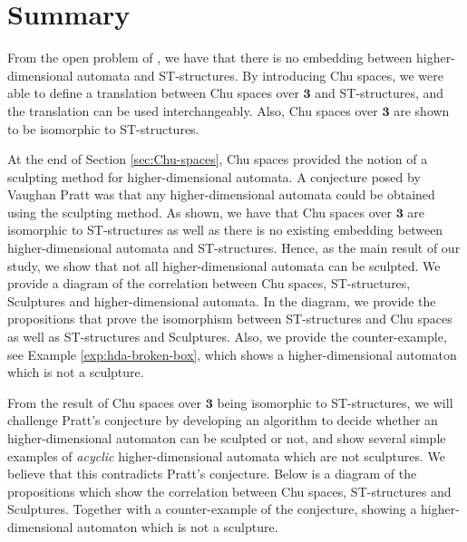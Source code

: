 \section{Summary}
\label{sec:summary-4-relationship}

    From the open problem of \cite{Johansen16STstruct}, we have that there is no embedding between higher-dimensional automata and ST-structures. By introducing Chu spaces, we were able to define a translation between Chu spaces over $\mathbf{3}$ and ST-structures, and the translation can be used interchangeably. Also, Chu spaces over $\mathbf{3}$ are shown to be isomorphic to ST-structures.
    
    At the end of Section \ref{sec:Chu-spaces}, Chu spaces provided the notion of a sculpting method for higher-dimensional automata. A conjecture posed by Vaughan Pratt was that any higher-dimensional automata could be obtained using the sculpting method. As shown, we have that Chu spaces over $\mathbf{3}$ are isomorphic to ST-structures as well as there is no existing embedding between higher-dimensional automata and ST-structures. Hence, as the main result of our study, we show that not all higher-dimensional automata can be sculpted. We provide a diagram of the correlation between Chu spaces, ST-structures, Sculptures and higher-dimensional automata. In the diagram, we provide the propositions that prove the isomorphism between ST-structures and Chu spaces as well as ST-structures and Sculptures. Also, we provide the counter-example, see Example \ref{exp:hda-broken-box}, which shows a higher-dimensional automaton which is not a sculpture.
    
    
    From the result of Chu spaces over $\mathbf{3}$ being isomorphic to ST-structures, we will challenge Pratt's conjecture by developing an algorithm to decide whether an higher-dimensional automaton can be sculpted or not, and show several simple examples of \emph{acyclic} higher-dimensional automata which are not sculptures. We believe that this contradicts Pratt's conjecture. Below is a diagram of the propositions which show the correlation between Chu spaces, ST-structures and Sculptures. Together with a counter-example of the conjecture, showing a higher-dimensional automaton which is not a sculpture.
    
    

